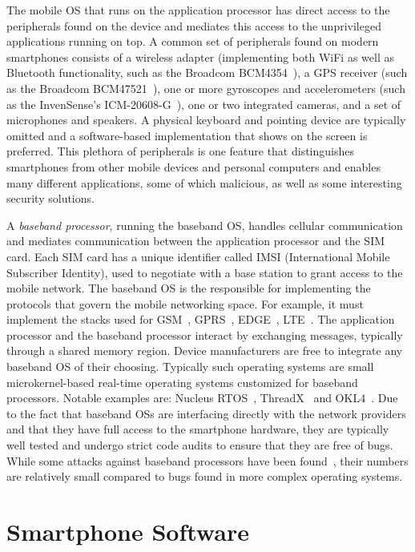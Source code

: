 The mobile OS that runs on the application processor has direct access to the
peripherals found on the device and mediates this access to the unprivileged
applications running on top. A common set of peripherals found on modern
smartphones consists of a wireless adapter (implementing both WiFi as well as
Bluetooth functionality, such as the Broadcom BCM4354~\cite{broadcombcm}), a
GPS receiver (such as the Broadcom BCM47521~\cite{broadcomgps}), one or more
gyroscopes and accelerometers (such as the InvenSense's
ICM-20608-G~\cite{6axis}), one or two integrated cameras, and a set of
microphones and speakers. A physical keyboard and pointing device are typically
omitted and a software-based implementation that shows on the screen is
preferred. This plethora of peripherals is one feature that distinguishes
smartphones from other mobile devices and personal computers and enables many
different applications, some of which malicious, as well as some interesting
security solutions.

A \emph{baseband processor}, running the baseband OS, handles cellular
communication and mediates communication between the application processor and
the SIM card. Each SIM card has a unique identifier called IMSI (International
Mobile Subscriber Identity), used to negotiate with a base station to grant
access to the mobile network. The baseband OS is the responsible for
implementing the protocols that govern the mobile networking space. For
example, it must implement the stacks used for GSM~\cite{etsigsm},
GPRS~\cite{etsigprs}, EDGE~\cite{etsiedge}, LTE~\cite{etsilte}. The
application processor and the baseband processor interact by exchanging
messages, typically through a shared memory region. Device manufacturers are
free to integrate any baseband OS of their choosing. Typically such operating
systems are small microkernel-based real-time operating systems customized for
baseband processors. Notable examples are: Nucleus RTOS~\cite{nucleos},
ThreadX~\cite{threadx} and OKL4~\cite{okl4}. Due to the fact that baseband OSs are interfacing directly with the network providers and that they have full access to the smartphone hardware, they are typically well tested and undergo
strict code audits to ensure that they are free of bugs. While some attacks against baseband processors have been found~\cite{basebandwoot,basebandccc}, their numbers are relatively small compared to bugs found in more complex operating systems.

\section{Smartphone Software}
\label{sec:bg_software}

